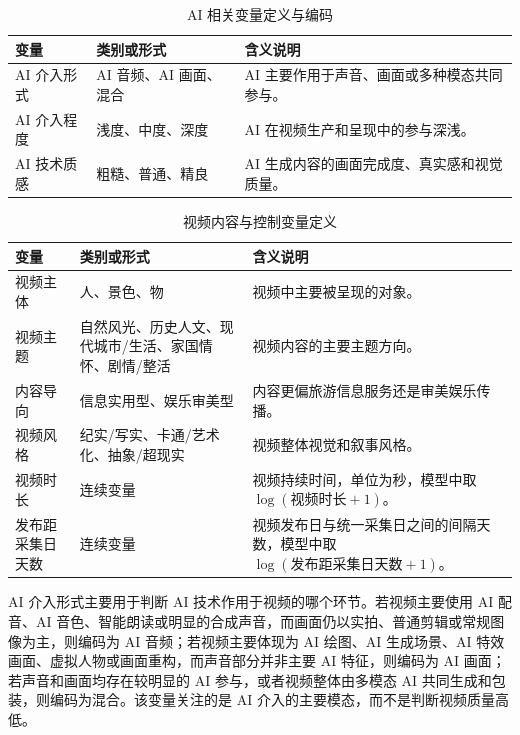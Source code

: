 \begin{table}[!htbp]
  \centering
  \vspace{-0.5em}
  \caption{AI 相关变量定义与编码}
  \label{tab:variables-ai}
  \scriptsize
  \setlength{\tabcolsep}{3pt}
  \renewcommand{\arraystretch}{0.86}
  \begin{tabular}{L{0.20\textwidth}L{0.25\textwidth}L{0.43\textwidth}}
    \toprule
    变量 & 类别或形式 & 含义说明 \\
    \midrule
    AI 介入形式 & AI 音频、AI 画面、混合 & AI 主要作用于声音、画面或多种模态共同参与。 \\
    AI 介入程度 & 浅度、中度、深度 & AI 在视频生产和呈现中的参与深浅。 \\
    AI 技术质感 & 粗糙、普通、精良 & AI 生成内容的画面完成度、真实感和视觉质量。 \\
    \bottomrule
  \end{tabular}
  \vspace{-0.8em}
\end{table}

\begin{table}[!htbp]
  \centering
  \vspace{-0.5em}
  \caption{视频内容与控制变量定义}
  \label{tab:variables-content}
  \scriptsize
  \setlength{\tabcolsep}{3pt}
  \renewcommand{\arraystretch}{0.86}
  \begin{tabular}{L{0.20\textwidth}L{0.25\textwidth}L{0.43\textwidth}}
    \toprule
    变量 & 类别或形式 & 含义说明 \\
    \midrule
    视频主体 & 人、景色、物 & 视频中主要被呈现的对象。 \\
    视频主题 & 自然风光、历史人文、现代城市/生活、家国情怀、剧情/整活 & 视频内容的主要主题方向。 \\
    内容导向 & 信息实用型、娱乐审美型 & 内容更偏旅游信息服务还是审美娱乐传播。 \\
    视频风格 & 纪实/写实、卡通/艺术化、抽象/超现实 & 视频整体视觉和叙事风格。 \\
    视频时长 & 连续变量 & 视频持续时间，单位为秒，模型中取 $\log(\text{视频时长}+1)$。 \\
    发布距采集日天数 & 连续变量 & 视频发布日与统一采集日之间的间隔天数，模型中取 $\log(\text{发布距采集日天数}+1)$。 \\
    \bottomrule
  \end{tabular}
  \vspace{-0.8em}
\end{table}

AI 介入形式主要用于判断 AI 技术作用于视频的哪个环节。若视频主要使用 AI 配音、AI 音色、智能朗读或明显的合成声音，而画面仍以实拍、普通剪辑或常规图像为主，则编码为 AI 音频；若视频主要体现为 AI 绘图、AI 生成场景、AI 特效画面、虚拟人物或画面重构，而声音部分并非主要 AI 特征，则编码为 AI 画面；若声音和画面均存在较明显的 AI 参与，或者视频整体由多模态 AI 共同生成和包装，则编码为混合。该变量关注的是 AI 介入的主要模态，而不是判断视频质量高低。

